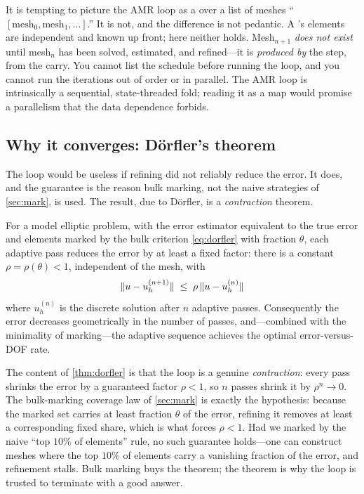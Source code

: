 \begin{pitfall}
It is tempting to picture the AMR loop as a  over a list of meshes
``$[\text{mesh}_0, \text{mesh}_1, \dots]$.'' It is not, and the difference is not
pedantic. A 's elements are independent and known up front; here neither
holds. Mesh$_{n+1}$ \emph{does not exist} until mesh$_n$ has been solved, estimated,
and refined---it is \emph{produced by} the step, from the carry. You cannot list the
schedule before running the loop, and you cannot run the iterations out of order or in
parallel. The AMR loop is intrinsically a sequential, state-threaded fold; reading it
as a map would promise a parallelism that the data dependence forbids.
\end{pitfall}

\subsection{Why it converges: D\"orfler's theorem}

The loop would be useless if refining did not reliably reduce the error. It does, and
the guarantee is the reason bulk marking, not the naive strategies of
\cref{sec:mark}, is used. The result, due to D\"orfler, is a \emph{contraction}
theorem.

\begin{theorem}
\label{thm:dorfler}
For a model elliptic problem, with the error estimator equivalent to the true error
and elements marked by the bulk criterion \cref{eq:dorfler} with fraction $\theta$,
each adaptive pass reduces the error by at least a fixed factor: there is a constant
$\rho = \rho(\theta) < 1$, independent of the mesh, with
\begin{equation}
\lVert u - u_{h}^{(n+1)}\rVert \;\le\; \rho \, \lVert u - u_{h}^{(n)}\rVert
\label{eq:contraction}
\end{equation}
where $u_h^{(n)}$ is the discrete solution after $n$ adaptive passes. Consequently the
error decreases geometrically in the number of passes, and---combined with the
minimality of marking---the adaptive sequence achieves the optimal error-versus-DOF
rate.
\end{theorem}

The content of \cref{thm:dorfler} is that the loop is a genuine \emph{contraction}:
every pass shrinks the error by a guaranteed factor $\rho < 1$, so $n$ passes shrink
it by $\rho^n \to 0$. The bulk-marking coverage law of \cref{sec:mark} is exactly the
hypothesis: because the marked set carries at least fraction $\theta$ of the error,
refining it removes at least a corresponding fixed share, which is what forces
$\rho < 1$. Had we marked by the naive ``top $10\%$ of elements'' rule, no such
guarantee holds---one can construct meshes where the top $10\%$ of elements carry a
vanishing fraction of the error, and refinement stalls. Bulk marking buys the
theorem; the theorem is why the loop is trusted to terminate with a good answer.

